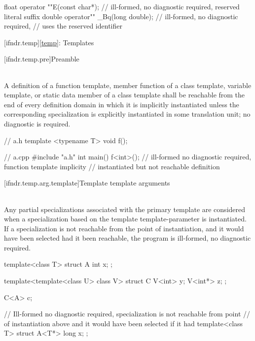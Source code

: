 \pnum
\begin{example}
\begin{codeblock}
float operator ""E(const char*);        // ill-formed, no diagnostic required, reserved literal suffix
double operator"" _Bq(long double);     // ill-formed, no diagnostic required, // uses the reserved identifier 
\end{codeblock}
\end{example}

[ifndr.temp]{\ref{temp}: Templates}

[ifndr.temp.pre]{Preamble}

\pnum
{} \\
A definition of a function template, member function of a class template, variable template, or static data
member of a class template shall be reachable from the end of every definition domain in which it is
implicitly instantiated unless the corresponding specialization is explicitly instantiated in
some translation unit; no diagnostic is required.

\pnum
\begin{example}
\begin{codeblock}
// a.h
template <typename T>
void f();

// a.cpp
#include "a.h"
int main() {
    f<int>();   // ill-formed no diagnostic required, function template implicity
                // instantiated but not reachable definition
}
\end{codeblock}
\end{example}


[ifndr.temp.arg.template]{Template template arguments}

\pnum
{} \\
Any partial specializations associated with the primary template are considered when a specialization
based on the template template-parameter is instantiated. If a specialization is not reachable from the point of
instantiation, and it would have been selected had it been reachable, the program is ill-formed, no diagnostic
required.

\pnum
\begin{example}
\begin{codeblock}
template<class T> struct A {
  int x;
};

template<template<class U> class V> struct C {
  V<int> y;
  V<int*> z;
};

C<A> c;

// Ill-formed no diagnostic required, specialization is not reachable from point
// of instantiation above and it would have been selected if it had
template<class T> struct A<T*> {
  long x;
};
\end{codeblock}
\end{example}


